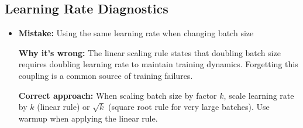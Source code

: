 \documentclass[../../main.tex]{subfiles}
\begin{document}
\subsection{Learning Rate Diagnostics}

\begin{commonmistakes}
\begin{itemize}
    \item \textbf{Mistake:} Using the same learning rate when changing batch size

    \textbf{Why it's wrong:} The linear scaling rule states that doubling batch size requires doubling learning rate to maintain training dynamics. Forgetting this coupling is a common source of training failures.

    \textbf{Correct approach:} When scaling batch size by factor $k$, scale learning rate by $k$ (linear rule) or $\sqrt{k}$ (square root rule for very large batches). Use warmup when applying the linear rule.
\end{itemize}
\end{commonmistakes}
\end{document}
